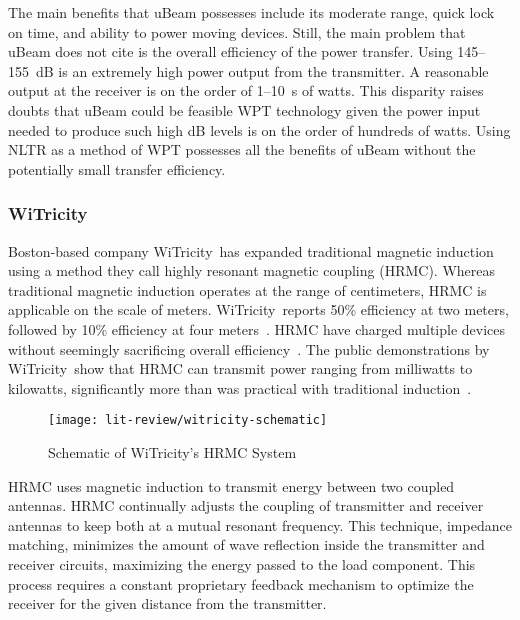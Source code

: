 The main benefits that uBeam possesses include its moderate range, quick lock on time, and ability to power moving devices. Still, the main problem that uBeam does not cite is the overall efficiency of the power transfer. Using \numrange{145}{155}~dB is an extremely high power output from the transmitter. A reasonable output at the receiver is on the order of \numrange{1}{10}~s of watts. This disparity raises doubts that uBeam could be feasible WPT technology given the power input needed to produce such high dB levels is on the order of hundreds of watts. Using NLTR as a method of WPT possesses all the benefits of uBeam without the potentially small transfer efficiency.

\subsubsection{WiTricity}

Boston-based company WiTricity\textregistered~has expanded traditional magnetic induction using a method they call highly resonant magnetic coupling (HRMC). Whereas traditional magnetic induction operates at the range of centimeters, HRMC is applicable on the scale of meters. WiTricity\textregistered~reports 50\% efficiency at two meters, followed by 10\% efficiency at four meters~\cite{kesler_highly_2013,tucker_contribution_2013}. HRMC have charged multiple devices without seemingly sacrificing overall efficiency~\cite{kesler_highly_2013}. The public demonstrations by WiTricity\textregistered~show that HRMC can transmit power ranging from milliwatts to kilowatts, significantly more than was practical with traditional induction~\cite{kesler_highly_2013}.

\begin{figure}[t]
\centering
\texttt{[image: lit-review/witricity-schematic]}
    \caption[WiTricity schematic]{Schematic of WiTricity’s HRMC System~\cite{kesler_highly_2013}}
    \label{fig:lit-review-witricity-schematic}
\end{figure}

HRMC uses magnetic induction to transmit energy between two coupled antennas. HRMC continually adjusts the coupling of transmitter and receiver antennas to keep both at a mutual resonant frequency. This technique, impedance matching, minimizes the amount of wave reflection inside the transmitter and receiver circuits, maximizing the energy passed to the load component. This process requires a constant proprietary feedback mechanism to optimize the receiver for the given distance from the transmitter.

